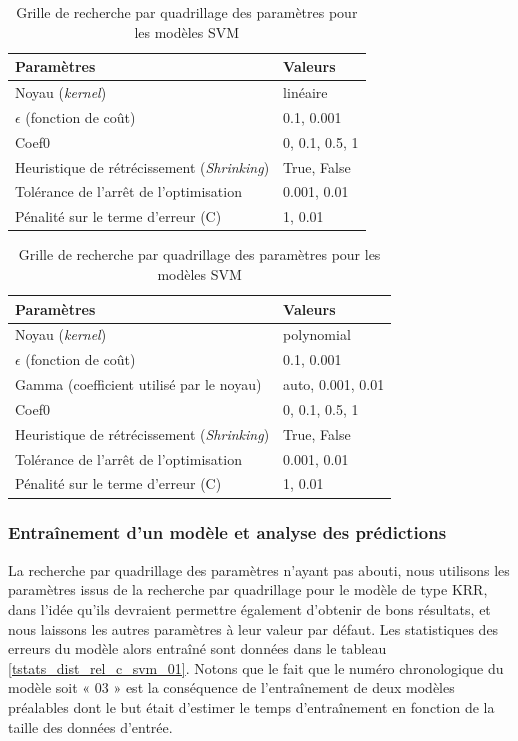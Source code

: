 \begin{table}
	\centering
	
	\begin{tabular}{|l|l|}
		\hline
		\textbf{Paramètres} & \textbf{Valeurs} \\ \hline 
		Noyau (\emph{kernel}) & linéaire\\ \hline
		$\epsilon$ (fonction de coût) & 0.1, 0.001 \\ \hline
		Coef0 & 0, 0.1, 0.5, 1 \\ \hline
		Heuristique de rétrécissement (\emph{Shrinking}) & True, False \\ \hline
		Tolérance de l'arrêt de l'optimisation & 0.001, 0.01 \\ \hline
		Pénalité sur le terme d'erreur (C) & 1, 0.01\\ \hline
	\end{tabular}
	
	\vspace{0.5cm}	

	\begin{tabular}{|l|l|}
		\hline
		\textbf{Paramètres} & \textbf{Valeurs} \\ \hline 
		Noyau (\emph{kernel}) & polynomial\\ \hline
		$\epsilon$ (fonction de coût) & 0.1, 0.001 \\ \hline
		Gamma (coefficient utilisé par le noyau) & auto, 0.001, 0.01 \\ \hline
		Coef0 & 0, 0.1, 0.5, 1 \\ \hline
		Heuristique de rétrécissement (\emph{Shrinking}) & True, False \\ \hline
		Tolérance de l'arrêt de l'optimisation & 0.001, 0.01 \\ \hline
		Pénalité sur le terme d'erreur (C) & 1, 0.01\\ \hline
	\end{tabular}		
	
	\caption{Grille de recherche par quadrillage des paramètres pour les modèles SVM}
	\label{tgrille_quadri_dist_rel_c_svm_01}
\end{table}

\subsubsection{Entraînement d'un modèle et analyse des prédictions}
\par La recherche par quadrillage des paramètres n'ayant pas abouti, nous utilisons les paramètres issus de la recherche par quadrillage pour le modèle de type KRR, dans l'idée qu'ils devraient permettre également d'obtenir de bons résultats, et nous laissons les autres paramètres à leur valeur par défaut. Les statistiques des erreurs du modèle alors entraîné sont données dans le tableau \ref{tstats_dist_rel_c_svm_01}. Notons que le fait que le numéro chronologique du modèle soit « 03 » est la conséquence de l'entraînement de deux modèles préalables dont le but était d'estimer le temps d'entraînement en fonction de la taille des données d'entrée.\\

